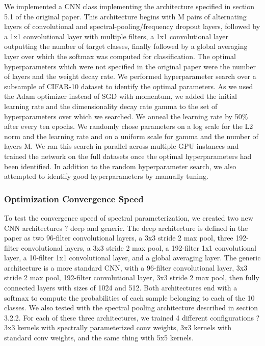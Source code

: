 \documentclass[10pt,journal,compsoc]{IEEEtran}
\begin{document}
We implemented a CNN class implementing the architecture specified in section 5.1 of the original paper. This architecture begins with M pairs of alternating layers of convolutional and spectral-pooling/frequency dropout layers, followed by a 1x1 convolutional layer with multiple filters, a 1x1 convolutional layer outputting the number of target classes, finally followed by a global averaging layer over which the softmax was computed for classification. The optimal hyperparameters which were not specified in the original paper were the number of layers and the weight decay rate. We performed hyperparameter search over a subsample of CIFAR-10 dataset to identify the optimal parameters. As we used the Adam optimizer instead of SGD with momentum, we added the initial learning rate and the dimensionality decay rate gamma to the set of hyperparameters over which we searched. We anneal the learning rate by 50\% after every ten epochs. We randomly chose parameters on a log scale for the L2 norm and the learning rate and on a uniform scale for gamma and the number of layers M. We ran this search in parallel across multiple GPU instances and trained the network on the full datasets once the optimal hyperparameters had been identified. In addition to the random hyperparameter search, we also attempted to identify good hyperparameters by manually tuning.

\subsubsection{Optimization Convergence Speed}

To test the convergence speed of spectral parameterization, we created two new CNN architectures ? deep and generic. The deep architecture is defined in the paper as two 96-filter convolutional layers, a 3x3 stride 2 max pool, three 192-filter convolutional layers, a 3x3 stride 2 max pool, a 192-filter 1x1 convolutional layer, a 10-filter 1x1 convolutional layer, and a global averaging layer. The generic architecture is a more standard CNN, with a 96-filter convolutional layer, 3x3 stride 2 max pool, 192-filter convolutional layer, 3x3 stride 2 max pool, then fully connected layers with sizes of 1024 and 512. Both architectures end with a softmax to compute the probabilities of each sample belonging to each of the 10 classes. We also tested with the spectral pooling architecture described in section 3.2.2. For each of these three architectures, we trained 4 different configurations ? 3x3 kernels with spectrally parameterized conv weights, 3x3 kernels with standard conv weights, and the same thing with 5x5 kernels.
\end{document}
